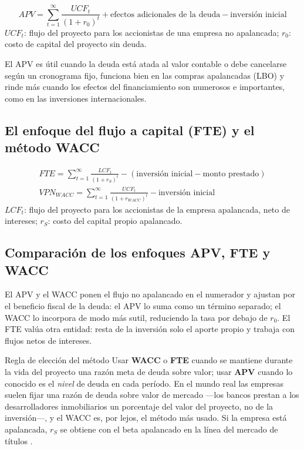 \begin{formulaBox}
\[
APV = \sum_{t=1}^{\infty}\frac{UCF_t}{(1+r_0)^t} + \text{efectos adicionales de la deuda} - \text{inversión inicial}
\]
$UCF_t$: flujo del proyecto para los accionistas de una empresa no apalancada; $r_0$: costo de capital del proyecto sin deuda.
\end{formulaBox}

El APV es útil cuando la deuda está atada al valor contable o debe cancelarse según un cronograma fijo, funciona bien en las compras apalancadas (LBO) y rinde más cuando los efectos del financiamiento son numerosos e importantes, como en las inversiones internacionales.

\subsection{El enfoque del flujo a capital (FTE) y el método WACC}

\begin{formulaBox}
\[
\begin{gathered}
FTE = \sum_{t=1}^{\infty}\frac{LCF_t}{(1+r_S)^t} - (\text{inversión inicial} - \text{monto prestado})
\\[4pt]
VPN_{WACC} = \sum_{t=1}^{\infty}\frac{UCF_t}{(1+r_{WACC})^t} - \text{inversión inicial}
\end{gathered}
\]
$LCF_t$: flujo del proyecto para los accionistas de la empresa apalancada, neto de intereses; $r_S$: costo del capital propio apalancado.
\end{formulaBox}

\subsection{Comparación de los enfoques APV, FTE y WACC}

El APV y el WACC ponen el flujo no apalancado en el numerador y ajustan por el beneficio fiscal de la deuda: el APV lo suma como un término separado; el WACC lo incorpora de modo más sutil, reduciendo la tasa por debajo de $r_0$. El FTE valúa otra entidad: resta de la inversión solo el aporte propio y trabaja con flujos netos de intereses.

\begin{definicion}{Regla de elección del método}
Usar \textbf{WACC} o \textbf{FTE} cuando se mantiene durante la vida del proyecto una razón meta de deuda sobre valor; usar \textbf{APV} cuando lo conocido es el \emph{nivel} de deuda en cada período. En el mundo real las empresas suelen fijar una razón de deuda sobre valor de mercado —los bancos prestan a los desarrolladores inmobiliarios un porcentaje del valor del proyecto, no de la inversión—, y el WACC es, por lejos, el método más usado. Si la empresa está apalancada, $r_S$ se obtiene con el beta apalancado en la línea del mercado de títulos .
\end{definicion}

